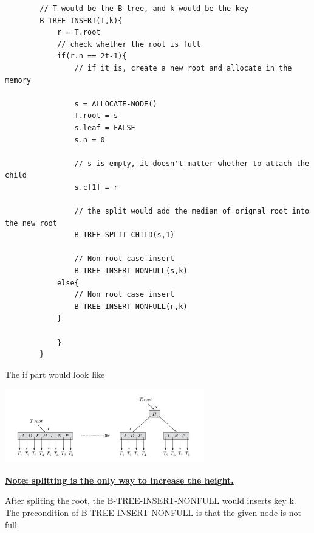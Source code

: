     \begin{lstlisting}
        // T would be the B-tree, and k would be the key 
        B-TREE-INSERT(T,k){
            r = T.root
            // check whether the root is full
            if(r.n == 2t-1){
                // if it is, create a new root and allocate in the memory

                s = ALLOCATE-NODE()
                T.root = s
                s.leaf = FALSE
                s.n = 0

                // s is empty, it doesn't matter whether to attach the child
                s.c[1] = r

                // the split would add the median of orignal root into the new root
                B-TREE-SPLIT-CHILD(s,1)

                // Non root case insert
                B-TREE-INSERT-NONFULL(s,k)
            else{
                // Non root case insert
                B-TREE-INSERT-NONFULL(r,k)
            }

            }
        }
    \end{lstlisting}

        The if part would look like 

        \includegraphics[width=0.65\textwidth]{contents/Advanced_Data_Structure/B_Tree/Images/split_the_root.png}

        \underline{\textbf{Note: splitting is the only way to increase the height.}}

    After spliting the root, the B-TREE-INSERT-NONFULL would inserts key k.
    The precondition of B-TREE-INSERT-NONFULL is that the given node is not full.

